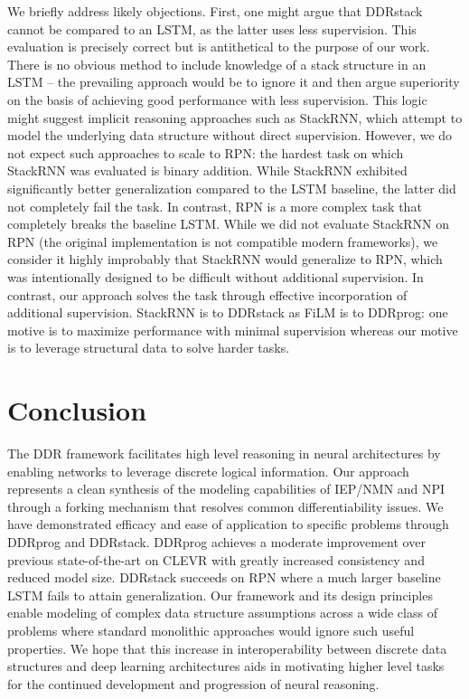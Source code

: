 \documentclass{article}
\begin{document}
We briefly address likely objections. First, one might argue that DDRstack cannot be compared to an LSTM, as the latter uses less supervision. This evaluation is precisely correct but is antithetical to the purpose of our work. There is no obvious method to include knowledge of a stack structure in an LSTM -- the prevailing approach would be to ignore it and then argue superiority on the basis of achieving good performance with less supervision. This logic might suggest implicit reasoning approaches such as StackRNN, which attempt to model the underlying data structure without direct supervision. However, we do not expect such approaches to scale to RPN: the hardest task on which StackRNN was evaluated is binary addition. While StackRNN exhibited significantly better generalization compared to the LSTM baseline, the latter did not completely fail the task. In contrast, RPN is a more complex task that completely breaks the baseline LSTM. While we did not evaluate StackRNN on RPN (the original implementation is not compatible modern frameworks), we consider it highly improbably that StackRNN would generalize to RPN, which was intentionally designed to be difficult without additional supervision. In contrast, our approach solves the task through effective incorporation of additional supervision. StackRNN is to DDRstack as FiLM is to DDRprog: one motive is to maximize performance with minimal supervision whereas our motive is to leverage structural data to solve harder tasks.

\section{Conclusion}
The DDR framework facilitates high level reasoning in neural architectures by enabling networks to leverage discrete logical information. Our approach represents a clean synthesis of the modeling capabilities of IEP/NMN and NPI through a forking mechanism that resolves common differentiability issues. We have demonstrated efficacy and ease of application to specific problems through DDRprog and DDRstack. DDRprog achieves a moderate improvement over previous state-of-the-art on CLEVR with greatly increased consistency and reduced model size. DDRstack succeeds on RPN where a much larger baseline LSTM fails to attain generalization. Our framework and its design principles enable modeling of complex data structure assumptions across a wide class of problems where standard monolithic approaches would ignore such useful properties. We hope that this increase in interoperability between discrete data structures and deep learning architectures aids in motivating higher level tasks for the continued development and progression of neural reasoning.
\end{document}
